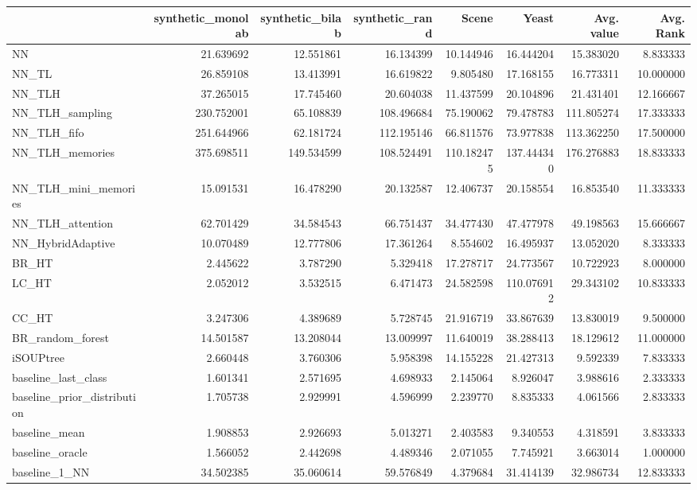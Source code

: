 \begin{tabular}{lrrrrrrr}
\toprule
 & synthetic_monolab & synthetic_bilab & synthetic_rand & Scene & Yeast & Avg. value & Avg. Rank \\
\midrule
NN & 21.639692 & 12.551861 & 16.134399 & 10.144946 & 16.444204 & 15.383020 & 8.833333 \\
NN_TL & 26.859108 & 13.413991 & 16.619822 & 9.805480 & 17.168155 & 16.773311 & 10.000000 \\
NN_TLH & 37.265015 & 17.745460 & 20.604038 & 11.437599 & 20.104896 & 21.431401 & 12.166667 \\
NN_TLH_sampling & 230.752001 & 65.108839 & 108.496684 & 75.190062 & 79.478783 & 111.805274 & 17.333333 \\
NN_TLH_fifo & 251.644966 & 62.181724 & 112.195146 & 66.811576 & 73.977838 & 113.362250 & 17.500000 \\
NN_TLH_memories & 375.698511 & 149.534599 & 108.524491 & 110.182475 & 137.444340 & 176.276883 & 18.833333 \\
NN_TLH_mini_memories & 15.091531 & 16.478290 & 20.132587 & 12.406737 & 20.158554 & 16.853540 & 11.333333 \\
NN_TLH_attention & 62.701429 & 34.584543 & 66.751437 & 34.477430 & 47.477978 & 49.198563 & 15.666667 \\
NN_HybridAdaptive & 10.070489 & 12.777806 & 17.361264 & 8.554602 & 16.495937 & 13.052020 & 8.333333 \\
BR_HT & 2.445622 & 3.787290 & 5.329418 & 17.278717 & 24.773567 & 10.722923 & 8.000000 \\
LC_HT & 2.052012 & 3.532515 & 6.471473 & 24.582598 & 110.076912 & 29.343102 & 10.833333 \\
CC_HT & 3.247306 & 4.389689 & 5.728745 & 21.916719 & 33.867639 & 13.830019 & 9.500000 \\
BR_random_forest & 14.501587 & 13.208044 & 13.009997 & 11.640019 & 38.288413 & 18.129612 & 11.000000 \\
iSOUPtree & 2.660448 & 3.760306 & 5.958398 & 14.155228 & 21.427313 & 9.592339 & 7.833333 \\
baseline_last_class & 1.601341 & 2.571695 & 4.698933 & 2.145064 & 8.926047 & 3.988616 & 2.333333 \\
baseline_prior_distribution & 1.705738 & 2.929991 & 4.596999 & 2.239770 & 8.835333 & 4.061566 & 2.833333 \\
baseline_mean & 1.908853 & 2.926693 & 5.013271 & 2.403583 & 9.340553 & 4.318591 & 3.833333 \\
baseline_oracle & 1.566052 & 2.442698 & 4.489346 & 2.071055 & 7.745921 & 3.663014 & 1.000000 \\
baseline_1_NN & 34.502385 & 35.060614 & 59.576849 & 4.379684 & 31.414139 & 32.986734 & 12.833333 \\
\bottomrule
\end{tabular}
